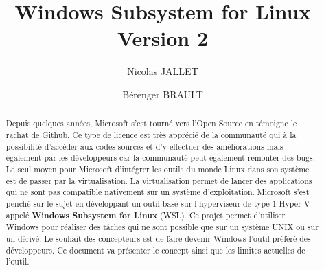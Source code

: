 \documentclass[acmlarge,screen]{acmart}
\begin{document}
%
\title{Windows Subsystem for Linux Version 2}

%
\author{Nicolas JALLET}

\author{Bérenger BRAULT}

%
\begin{abstract}
Depuis quelques années, Microsoft s'est tourné vers l'Open Source en témoigne le rachat de Github. Ce type de licence est très apprécié de la communauté qui à la possibilité d'accéder aux codes sources et d'y effectuer des améliorations mais également par les développeurs car la communauté peut également remonter des bugs.
Le seul moyen pour Microsoft d'intégrer les outils du monde Linux dans son système est de passer par la virtualisation.
La virtualisation permet de lancer des applications qui ne sont pas compatible nativement sur un système d'exploitation.
Microsoft s'est penché sur le sujet en développant un outil basé sur l'hyperviseur de type 1 Hyper-V appelé \textbf{Windows Subsystem for Linux} (WSL).
Ce projet permet d'utiliser Windows pour réaliser des tâches qui ne sont possible que sur un système UNIX ou sur un dérivé.
Le souhait des concepteurs est de faire devenir Windows l'outil préféré des développeurs. 
Ce document va présenter le concept ainsi que les limites actuelles de l'outil.
\end{abstract}

%

%
\end{document}
